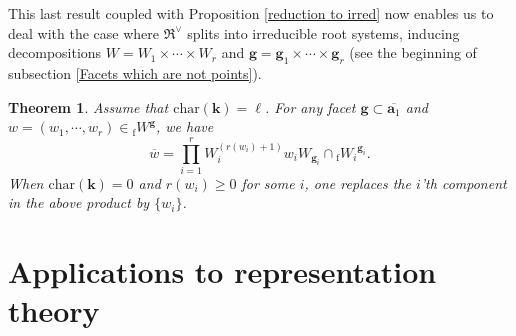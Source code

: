 \documentclass[11pt]{amsart}
\theoremstyle{plain}
\newtheorem{thm}{Theorem}[section]
\theoremstyle{remark}
\numberwithin{equation}{section}
\begin{document}
	This last result coupled with Proposition \ref{reduction to irred} now enables us to deal with the case where $\mathfrak{R}^\vee$ splits into irreducible root systems, inducing decompositions $W=W_1\times\cdots\times W_r$ and $\mathbf{g}=\mathbf{g}_1\times\cdots\times\mathbf{g}_r$ (see the beginning of subsection \ref{Facets which are not points}).
	\begin{thm}\label{cas final}
		Assume that $\mathrm{char}(\mathbf{k})=\ell$. For any facet $\mathbf{g}\subset\overline{\mathbf{a}_1}$ and $w=(w_1,\cdots,w_r)\in {_\mathrm{f}W}^\mathbf{g}$, we have
		\begin{equation*}
			\overline{w}=\prod_{i=1}^rW_i^{(r(w_i)+1)}w_iW_{\mathbf{g}_i}\cap {_\mathrm{f}W_i}^{\mathbf{g}_i}.
		\end{equation*}
		When $\mathrm{char}(\mathbf{k})=0$ and $r(w_i)\geq 0$ for some $i$, one replaces the $i$'th component in the above product by $\{w_i\}$.
	\end{thm}
	
	\section{Applications to representation theory}\label{Applications to representation theory}
\end{document}
